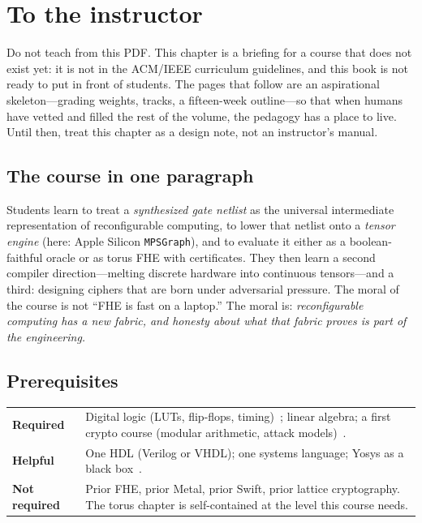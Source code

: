 \chapter{To the instructor}
\label{ch:instructor}

Do not teach from this PDF.
This chapter is a briefing for a course that does not exist yet: it is not
in the ACM/IEEE curriculum guidelines, and this book is not ready to put
in front of students.
The pages that follow are an aspirational skeleton---grading weights,
tracks, a fifteen-week outline---so that when humans have vetted and
filled the rest of the volume, the pedagogy has a place to live.
Until then, treat this chapter as a design note, not an instructor's
manual.

\section{The course in one paragraph}

Students learn to treat a \emph{synthesized gate netlist} as the universal
intermediate representation of reconfigurable computing, to lower that netlist
onto a \emph{tensor engine} (here: Apple Silicon \texttt{MPSGraph}), and to
evaluate it either as a boolean-faithful oracle or as torus FHE with
certificates.
They then learn a second compiler direction---melting discrete hardware into
continuous tensors---and a third: designing ciphers that are born under
adversarial pressure.
The moral of the course is not ``FHE is fast on a laptop.''
The moral is: \emph{reconfigurable computing has a new fabric, and honesty about
what that fabric proves is part of the engineering.}

\section{Prerequisites}

\begin{center}
\begin{tabular}{@{}lp{}@{}}
\toprule
\textbf{Required} & Digital logic (LUTs, flip-flops, timing)~\cite{harris2012digital};
linear algebra; a first crypto course (modular arithmetic, attack models)~\cite{paar2009crypto}. \\
\textbf{Helpful} & One HDL (Verilog or VHDL); one systems language; Yosys as a
black box~\cite{yosys}. \\
\textbf{Not required} & Prior FHE, prior Metal, prior Swift, prior lattice
cryptography. The torus chapter is self-contained at the level this course needs.
\\
\bottomrule
\end{tabular}
\end{center}

